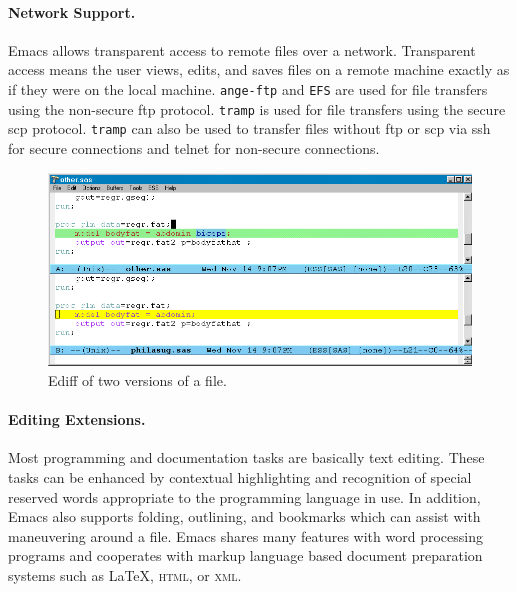 \documentclass{article}
\newif\ifdraft
\newcommand{\stexttt}[1]{{\small\texttt{#1}}}
\newcommand{\emptyfig}{
\hspace*{42pt}\rule{324pt}{.25pt}\\
\hspace*{42pt}\rule{.25pt}{10pc}
\rule{316pt}{.25pt}
\rule{.25pt}{10pc}}
\begin{document}
\paragraph{Network Support.}
Emacs allows transparent access to remote files over a network.
Transparent access means the user views, edits, and saves files on a
remote machine exactly as if they were on the local machine.
\stexttt{ange-ftp} and \stexttt{EFS} are used for file transfers using
the non-secure ftp protocol.  \stexttt{tramp} is used for file
transfers using the secure scp protocol.  \stexttt{tramp} can also be
used to transfer files without ftp or scp via ssh for secure
connections and telnet for non-secure connections.


\begin{figure}[htbp] 
 \centering
\ifdraft
  \emptyfig
\else
  \includegraphics[angle=270,width=\textwidth]{ediff-sas}
\fi
  \caption{Ediff of two versions of a file.}
  \label{f.ediff}
\end{figure}

\paragraph{Editing Extensions.}
Most programming and documentation tasks are basically text editing.
These tasks can be enhanced by contextual highlighting and recognition
of special reserved words appropriate to the programming language in
use.  In addition, Emacs also supports folding, outlining, and
bookmarks which can assist with maneuvering around a file.  Emacs
shares many features with word processing programs and cooperates with
markup language based document preparation systems such as \LaTeX,
\textsc{html}, or \textsc{xml}.
\end{document}
